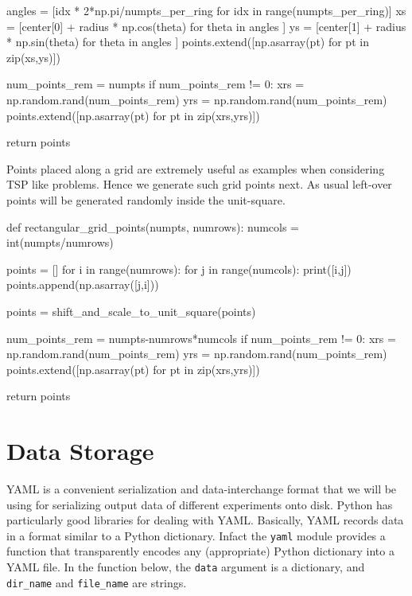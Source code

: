          angles = [idx * 2*np.pi/numpts_per_ring for idx in range(numpts_per_ring)]
          xs     = [center[0] + radius * np.cos(theta) for theta in angles ]
          ys     = [center[1] + radius * np.sin(theta) for theta in angles ]
          points.extend([np.asarray(pt) for pt in zip(xs,ys)])
     
     num_points_rem = numpts%
     if num_points_rem != 0:
          xrs = np.random.rand(num_points_rem)
          yrs = np.random.rand(num_points_rem)
          points.extend([np.asarray(pt) for pt in zip(xrs,yrs)])

     return points
\nwendcode{}\nwdocspar

Points placed along a grid are extremely useful as examples when considering TSP like 
problems. Hence we generate such grid points next. As usual left-over points will 
be generated randomly inside the unit-square. 



\nwenddocs{}\plusendmoddef\nwstartdeflinemarkup{}\nwenddeflinemarkup
def rectangular_grid_points(numpts, numrows):
     numcols = int(numpts/numrows)
     
     points = []
     for i in range(numrows):
         for j in range(numcols):
              print([i,j])
              points.append(np.asarray([j,i]))

     points = shift_and_scale_to_unit_square(points)

     num_points_rem = numpts-numrows*numcols
     if num_points_rem != 0:
          xrs = np.random.rand(num_points_rem)
          yrs = np.random.rand(num_points_rem)
          points.extend([np.asarray(pt) for pt in zip(xrs,yrs)])
     
     return points
\nwendcode{}\nwdocspar

\section{Data Storage}
YAML\cite{ben2009yaml} is a convenient serialization and data-interchange format that we will be using 
for serializing output data of different experiments onto disk. Python has particularly good libraries for dealing with YAML. Basically, 
YAML records data in a format similar to a Python dictionary. Infact the \texttt{yaml} module provides a function that
transparently encodes any (appropriate) Python dictionary into a YAML file. In the function below, the 
\texttt{data} argument is a dictionary, and \texttt{dir\_name} and \texttt{file\_name} are strings. 
 
